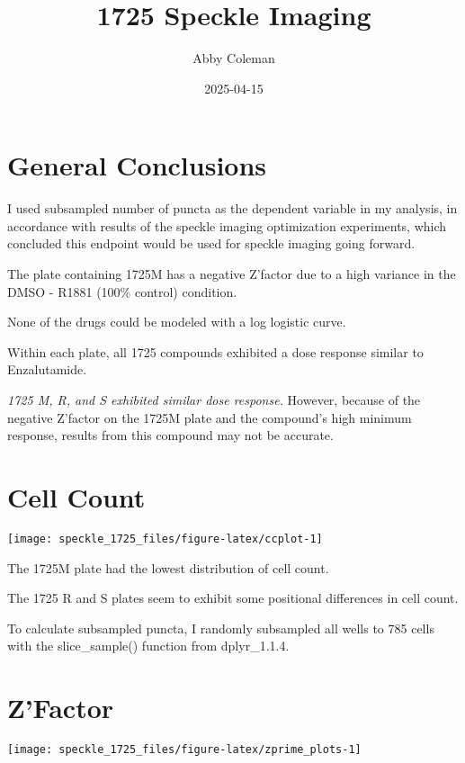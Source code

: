 \documentclass[
]{article}
\title{1725 Speckle Imaging}
\author{Abby Coleman}
\date{2025-04-15}
\begin{document}
\maketitle

{
\setcounter{tocdepth}{2}
\tableofcontents
}
\section{General Conclusions}\label{general-conclusions}

I used subsampled number of puncta as the dependent variable in my
analysis, in accordance with results of the speckle imaging optimization
experiments, which concluded this endpoint would be used for speckle
imaging going forward.

The plate containing 1725M has a negative Z'factor due to a high
variance in the DMSO - R1881 (100\% control) condition.

None of the drugs could be modeled with a log logistic curve.

Within each plate, all 1725 compounds exhibited a dose response similar
to Enzalutamide.

\emph{1725 M, R, and S exhibited similar dose response.} However,
because of the negative Z'factor on the 1725M plate and the compound's
high minimum response, results from this compound may not be accurate.

\section{Cell Count}\label{cell-count}

\begin{center}\texttt{[image: speckle\_1725\_files/figure-latex/ccplot-1]} \end{center}

The 1725M plate had the lowest distribution of cell count.

The 1725 R and S plates seem to exhibit some positional differences in
cell count.

To calculate subsampled puncta, I randomly subsampled all wells to 785
cells with the slice\_sample() function from dplyr\_1.1.4.

\newpage

\section{Z'Factor}\label{zfactor}

\begin{center}\texttt{[image: speckle\_1725\_files/figure-latex/zprime\_plots-1]} \end{center}
\end{document}
